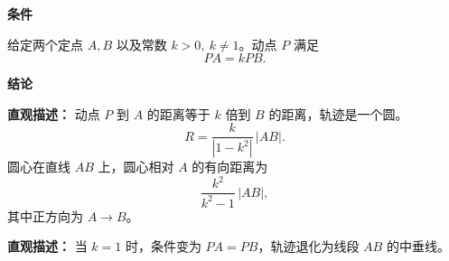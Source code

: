 \begin{statementbox}
	\textbf{\textcolor{CStatement}{条件}}
	\begin{description}[style=nextline, leftmargin=2.8em, labelsep=0.5em, itemsep=0.35em]
		\item[\textbf{\textcolor{CStatement}{条件 1（定点定比）：}}]
		      给定两个定点 $A,B$ 以及常数 $k>0,\ k\neq 1$。动点 $P$ 满足
		      \[
			      PA=kPB.
		      \]
	\end{description}

	\textbf{\textcolor{CStatement}{结论}}
	\begin{description}[style=nextline, leftmargin=2.8em, labelsep=0.5em, itemsep=0.45em]
		\item[\textbf{\textcolor{CStatement}{结论一（轨迹为圆）：}}]
		      \textbf{\textcolor{CStatement}{直观描述：}}
		      动点 $P$ 到 $A$ 的距离等于 $k$ 倍到 $B$ 的距离，轨迹是一个圆。
		      \[
			      R=\frac{k}{|1-k^{2}|}\,|AB|.
		      \]
		      圆心在直线 $AB$ 上，圆心相对 $A$ 的有向距离为
		      \[
			      \frac{k^{2}}{k^{2}-1}\,|AB|,
		      \]
		      其中正方向为 $A\to B$。

		\item[\textbf{\textcolor{CStatement}{推广结论（$k=1$ 退化）：}}]
		      \textbf{\textcolor{CStatement}{直观描述：}}
		      当 $k=1$ 时，条件变为 $PA=PB$，轨迹退化为线段 $AB$ 的中垂线。
	\end{description}
\end{statementbox}